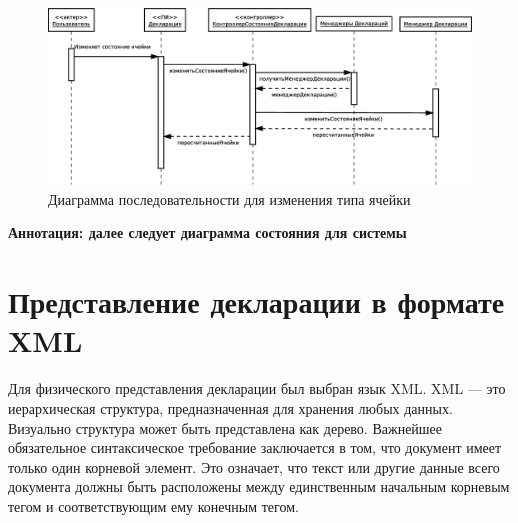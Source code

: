 \documentclass[14pt,a4paper]{reportmod}
\begin{document}
\begin{figure}
  \centering
  \includegraphics[scale=0.4]{uml/sequence_3}
  \caption{Диаграмма последовательности для изменения типа ячейки}
  \label{pic:sequence_3}
\end{figure}

\textbf{Аннотация: далее следует диаграмма состояния для системы}

\section{Представление декларации в формате XML}
Для физического представления декларации был выбран язык XML. XML — это иерархическая структура, предназначенная для хранения любых данных. Визуально структура может быть представлена как дерево. Важнейшее обязательное синтаксическое требование заключается в том, что документ имеет только один корневой элемент. Это означает, что текст или другие данные всего документа должны быть расположены между единственным начальным корневым тегом и соответствующим ему конечным тегом.
\end{document}
